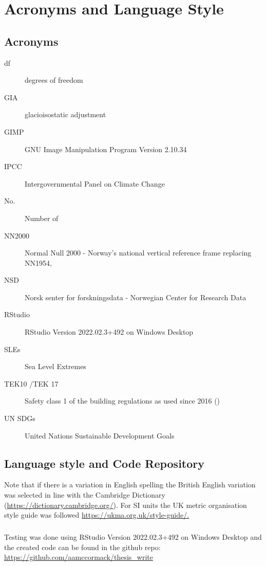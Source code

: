 \chapter{Acronyms and Language Style}

\section{Acronyms}
\begin{description}
\item[df]degrees of freedom
\item[GIA] glacioisostatic adjustment
\item[GIMP] GNU Image Manipulation Program Version 2.10.34
\item[IPCC] Intergovernmental Panel on Climate Change 
\item[No.] Number of
\item[NN2000] Normal Null 2000 - Norway's national vertical reference frame replacing NN1954, 
\item[NSD] Norsk senter for forskningsdata - Norwegian Center for Research Data
\item [RStudio] RStudio Version 2022.02.3+492 on Windows Desktop
\item[SLEs] Sea Level Extremes
\item[TEK10 /TEK 17] Safety class 1 of the building regulations as used since 2016 (\cite{tides_high_2022})
\item [UN SDGs] United Nations Sustainable Development Goals 
\end{description}

\section{Language style and Code Repository}
Note that if there is a variation in English spelling the British English variation was selected in line with the Cambridge Dictionary (\url{https://dictionary.cambridge.org/}). For SI units the UK metric organisation style guide was followed \url{https://ukma.org.uk/style-guide/.}  
\paragraph{}
Testing was done using RStudio Version 2022.02.3+492 on Windows Desktop and the created code can be found in the github repo: 
\url{ https://github.com/aamccormack/thesis_write}